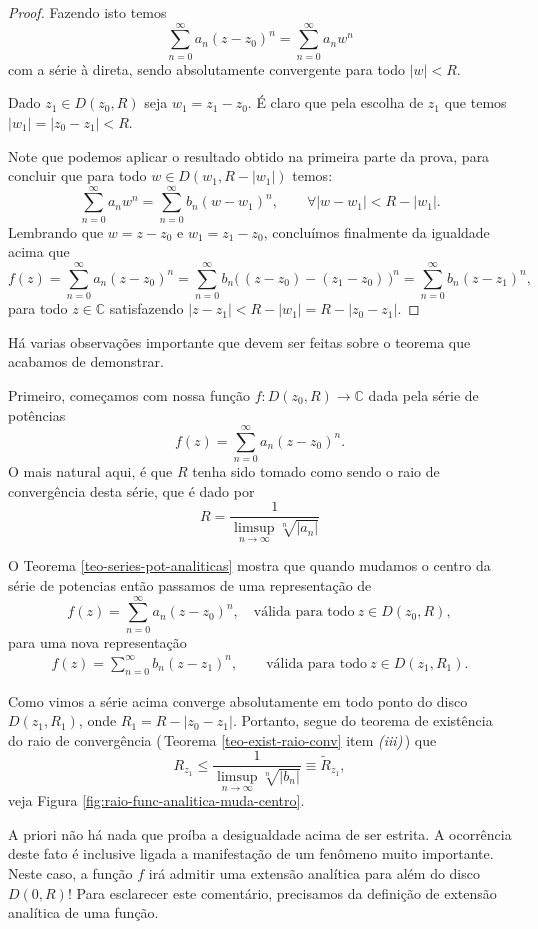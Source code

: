 \begin{proof}
Fazendo isto temos 
\[
\sum_{n=0}^{\infty}a_n(z-z_0)^n 
=
\sum_{n=0}^{\infty}a_n w^n 
\]
com a série à direta, sendo absolutamente convergente para todo $|w|<R$.

Dado $z_1\in D(z_0,R)$ seja $w_1=z_1-z_0$. É claro que pela escolha
de $z_1$ que temos $|w_1|=|z_0-z_1|<R$.

Note que podemos aplicar o resultado obtido na 
primeira parte da prova, para concluir que 
para todo $w\in D(w_1,R-|w_1|)$ temos:
\[
\sum_{n=0}^{\infty}a_n w^n
=
\sum_{n=0}^{\infty}b_n (w-w_1)^n, \qquad \forall |w-w_1|<R-|w_1|.
\]
Lembrando que $w=z-z_0$ e $w_1=z_1-z_0$, concluímos finalmente da
igualdade acima que 
\[
f(z)
=
\sum_{n=0}^{\infty}a_n (z-z_0)^n
=
\sum_{n=0}^{\infty}b_n \big(\,(z-z_0) -(z_1-z_0)\, \big)^n
=
\sum_{n=0}^{\infty}b_n (z-z_1)^n,
\]
para todo $z\in\mathbb{C}$ satisfazendo $|z-z_1|<R-|w_1|=R-|z_0-z_1|$.
\end{proof}

\bigskip

Há varias observações importante que devem ser feitas sobre o teorema que acabamos
de demonstrar. 


\bigskip 


Primeiro, começamos com nossa função $f:D(z_0,R)\to\mathbb{C}$
dada pela série de potências 
\[
f(z)=\sum_{n=0}^{\infty}a_n(z-z_0)^n.
\]
O mais natural aqui, é que $R$ tenha sido tomado como sendo o raio de convergência 
desta série, que é dado por
\[
R = \frac{1}{\displaystyle\limsup_{n\to\infty} \sqrt[n]{|a_n|}}
\]

O Teorema \ref{teo-series-pot-analiticas} mostra que 
quando mudamos o centro da série de potencias então 
passamos de uma representação de
\[
f(z) = \sum_{n=0}^{\infty}a_n(z-z_0)^n,
\quad \text{válida para todo}\  z\in D(z_0,R),
\] 
para uma nova representação
\begin{align}\label{eq-aux-exe-muda-centro-serie}
f(z) = \sum_{n=0}^{\infty}b_n(z-z_1)^n,
\qquad \text{válida para todo}\ z\in D(z_1,R_1).
\end{align}


Como vimos a série acima converge absolutamente em todo ponto do 
disco $D(z_1,R_1)$, onde $R_1=R-|z_0-z_1|$. Portanto, segue do teorema de existência 
do raio de convergência (\,Teorema \ref{teo-exist-raio-conv} item \textit{(iii)}\,) que
\[
R_{z_1} 
\leqslant 
\frac{1}{\displaystyle\limsup_{n\to\infty} \sqrt[n]{|b_n|}}
\equiv 
\widetilde{R}_{z_1},
\] 
veja Figura \ref{fig:raio-func-analitica-muda-centro}. 

A priori não há nada que proíba a desigualdade acima de ser estrita. 
A ocorrência deste fato é inclusive ligada 
a manifestação de um fenômeno muito importante.
Neste caso, a função $f$ irá admitir uma extensão analítica para além do disco $D(0,R)$!
Para esclarecer este comentário, precisamos 
da definição de extensão analítica de uma função. 

